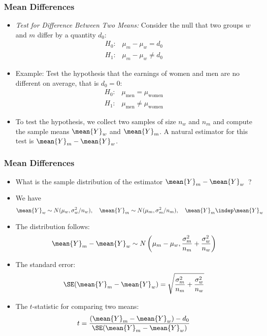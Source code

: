 

\begin{frame}
\frametitle{Mean Differences}
\begin{itemize}
\item \emph{Test for Difference Between Two Means:} 
Consider the null that two groups $w$ and $m$ differ by a quantity $d_0$:
\begin{align*}
H_0\colon & \mu_m - \mu_w = d_0 \\
H_1\colon & \mu_m - \mu_w \ne d_0 
\end{align*}
\item Example: Test the hypothesis that the earnings of women and men are no different on average, that is $d_0=0$:
\begin{align*}
H_0\colon & \mu_{\text{men}} = \mu_{\text{women}} \\
H_1\colon & \mu_{\text{men}} \ne \mu_{\text{women}}
\end{align*}
\item To test the hypothesis, we collect two samples of size $n_w$ and $n_m$ and compute the  sample means $\mean{Y}_w$ and $\mean{Y}_m$. A natural estimator for this test is $\mean{Y}_m-\mean{Y}_w$.
\end{itemize}
\end{frame}


\begin{frame}
\frametitle{Mean Differences}
\begin{itemize}
\item What is the sample distribution of the estimator $\mean{Y}_m-\mean{Y}_w$~?
\item We have
\begin{align*}
\mean{Y}_w \sim N(\mu_w, \sigma_w^2/n_w), \quad
\mean{Y}_m \sim N(\mu_m, \sigma_m^2/n_m), \quad
\mean{Y}_m \indep \mean{Y}_w
\end{align*}
\item The distribution follows:
\begin{align*}
\mean{Y}_m-\mean{Y}_w \sim N\left(\mu_m-\mu_w, \frac{\sigma_m^2}{n_m} + \frac{\sigma_w^2}{n_w} \right)
\end{align*}
\item The standard error:
\begin{align*}
\SE(\mean{Y}_m-\mean{Y}_w) 
  = \sqrt{\frac{\sigma_m^2}{n_m} + \frac{\sigma_w^2}{n_w}}
\end{align*}
\item The $t$-statistic for comparing two means:
\begin{align*}
t = \frac{(\mean{Y}_m-\mean{Y}_w) - d_0}{\SE(\mean{Y}_m-\mean{Y}_w)}
\end{align*}
\end{itemize}
\end{frame}

